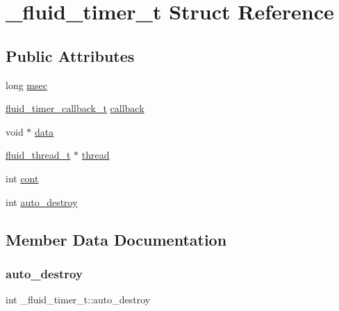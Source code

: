 \hypertarget{struct__fluid__timer__t}{}\section{\+\_\+fluid\+\_\+timer\+\_\+t Struct Reference}
\label{struct__fluid__timer__t}
\subsection*{Public Attributes}
\begin{DoxyCompactItemize}
\item 
long \hyperlink{struct__fluid__timer__t_aae7754f100795d28e356e3345fc23328}{msec}
\item 
\hyperlink{fluid__sys_8h_a99c65ece4353146a7d260e34df6477d4}{fluid\+\_\+timer\+\_\+callback\+\_\+t} \hyperlink{struct__fluid__timer__t_abae37c54472c13006f3af27316200af5}{callback}
\item 
void $\ast$ \hyperlink{struct__fluid__timer__t_abe01b14aba2dd52215dc1c5051748ce8}{data}
\item 
\hyperlink{fluid__sys_8h_a60a6466e68a45b0f0709f1ebaa7e6f85}{fluid\+\_\+thread\+\_\+t} $\ast$ \hyperlink{struct__fluid__timer__t_a5918205c8ccfda5a441b0ad060e4cda6}{thread}
\item 
int \hyperlink{struct__fluid__timer__t_ac349ff1e14f9bc753fb88fa9eb1b89ad}{cont}
\item 
int \hyperlink{struct__fluid__timer__t_ac540c3eec798d5c9811dc5d2feb96ca7}{auto\+\_\+destroy}
\end{DoxyCompactItemize}


\subsection{Member Data Documentation}
\mbox{\label{struct__fluid__timer__t_ac540c3eec798d5c9811dc5d2feb96ca7}} 
\subsubsection{\texorpdfstring{auto\+\_\+destroy}{auto\_destroy}}
{\footnotesize\ttfamily int \+\_\+fluid\+\_\+timer\+\_\+t\+::auto\+\_\+destroy}

